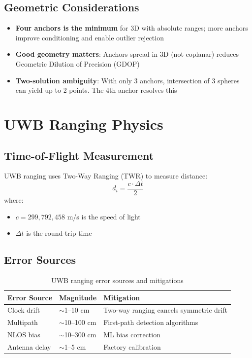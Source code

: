 \documentclass[11pt,a4paper]{article}
\begin{document}
\subsection{Geometric Considerations}

\begin{notebox}
\begin{itemize}
    \item \textbf{Four anchors is the minimum} for 3D with absolute ranges; more anchors improve conditioning and enable outlier rejection
    \item \textbf{Good geometry matters}: Anchors spread in 3D (not coplanar) reduces Geometric Dilution of Precision (GDOP)
    \item \textbf{Two-solution ambiguity}: With only 3 anchors, intersection of 3 spheres can yield up to 2 points. The 4th anchor resolves this
\end{itemize}
\end{notebox}

\section{UWB Ranging Physics}

\subsection{Time-of-Flight Measurement}

UWB ranging uses Two-Way Ranging (TWR) to measure distance:
\begin{equation}
    d_i = \frac{c \cdot \Delta t}{2}
\end{equation}
where:
\begin{itemize}
    \item $c = 299{,}792{,}458$ m/s is the speed of light
    \item $\Delta t$ is the round-trip time
\end{itemize}

\subsection{Error Sources}

\begin{table}[H]
\centering
\begin{tabular}{@{}lll@{}}
\toprule
\textbf{Error Source} & \textbf{Magnitude} & \textbf{Mitigation} \\
\midrule
Clock drift & $\sim$1--10 cm & Two-way ranging cancels symmetric drift \\
Multipath & $\sim$10--100 cm & First-path detection algorithms \\
NLOS bias & $\sim$10--300 cm & ML bias correction \\
Antenna delay & $\sim$1--5 cm & Factory calibration \\
\bottomrule
\end{tabular}
\caption{UWB ranging error sources and mitigations}
\end{table}
\end{document}
